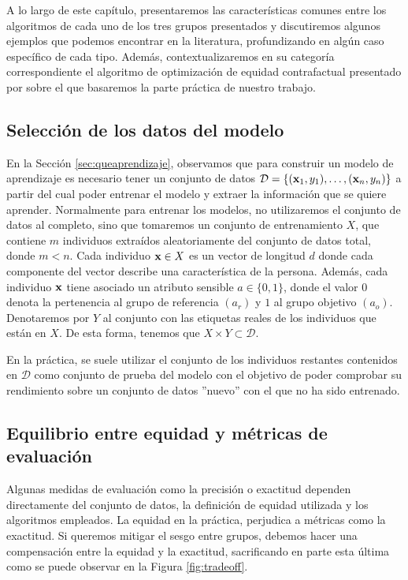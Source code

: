 \documentclass[oneside,openright,titlepage,numbers=noenddot,openany,headinclude,footinclude=true,
cleardoublepage=empty,abstractoff,BCOR=5mm,paper=a4,fontsize=12pt,main=spanish]{scrreprt}
\begin{document}
A lo largo de este capítulo, presentaremos las características comunes entre los algoritmos de cada uno de los tres grupos presentados y discutiremos algunos ejemplos que podemos encontrar en la literatura, profundizando en algún caso específico de cada tipo. Además, contextualizaremos en su categoría correspondiente el algoritmo de optimización de equidad contrafactual presentado por \cite{counterfactual2018} sobre el que basaremos la parte práctica de nuestro trabajo.

\subsection{Selección de los datos del modelo}

En la Sección \ref{sec:queaprendizaje}, observamos que para construir un modelo de aprendizaje es necesario tener un conjunto de datos $\mathcal{D}=\{(\textbf{x}_1,y_1),\dots,(\textbf{x}_n,y_n)\}$ a partir del cual poder entrenar el modelo y extraer la información que se quiere aprender. Normalmente para entrenar los modelos, no utilizaremos el conjunto de datos al completo, sino que tomaremos un conjunto de entrenamiento $X$, que contiene $m$  individuos extraídos aleatoriamente del conjunto de datos total, donde $m < n$. Cada individuo $\textbf{x} \in X$ es un vector de longitud $d$ donde cada componente del vector describe una característica de la persona. Además, cada individuo $\textbf{x}$ tiene asociado un atributo sensible $a\in \{0,1\}$, donde el valor $0$ denota la pertenencia al grupo de referencia $(a_r)$ y $1$ al grupo objetivo $(a_o)$. Denotaremos por $Y$ al conjunto con las etiquetas reales de los individuos que están en $X$. De esta forma, tenemos que $X \times Y \subset \mathcal{D}$. 

En la práctica, se suele utilizar el conjunto de los individuos restantes contenidos en $\mathcal{D}$ como conjunto de prueba del modelo con el objetivo de poder comprobar su rendimiento sobre un conjunto de datos ''nuevo'' con el que no ha sido entrenado. 

\subsection{Equilibrio entre equidad y métricas de evaluación}

Algunas medidas de evaluación como la precisión o exactitud dependen directamente del conjunto de datos, la definición de equidad utilizada y los algoritmos empleados. La equidad en la práctica, perjudica a métricas como la exactitud. Si queremos mitigar el sesgo entre grupos, debemos hacer una compensación entre la equidad y la exactitud, sacrificando en parte esta última como se puede observar en la Figura \ref{fig:tradeoff}.\\
\end{document}
